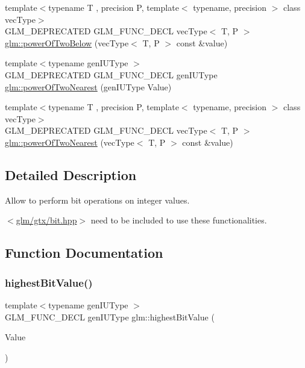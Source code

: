 \begin{DoxyCompactItemize}
\item 
{\footnotesize template$<$typename T , precision P, template$<$ typename, precision $>$ class vec\+Type$>$ }\\G\+L\+M\+\_\+\+D\+E\+P\+R\+E\+C\+A\+T\+ED G\+L\+M\+\_\+\+F\+U\+N\+C\+\_\+\+D\+E\+CL vec\+Type$<$ T, P $>$ \hyperlink{group__gtx__bit_gae33bb1ca2b55846b23a0f0796a679195}{glm\+::power\+Of\+Two\+Below} (vec\+Type$<$ T, P $>$ const \&value)
\item 
{\footnotesize template$<$typename gen\+I\+U\+Type $>$ }\\G\+L\+M\+\_\+\+D\+E\+P\+R\+E\+C\+A\+T\+ED G\+L\+M\+\_\+\+F\+U\+N\+C\+\_\+\+D\+E\+CL gen\+I\+U\+Type \hyperlink{group__gtx__bit_ga5f65973a5d2ea38c719e6a663149ead9}{glm\+::power\+Of\+Two\+Nearest} (gen\+I\+U\+Type Value)
\item 
{\footnotesize template$<$typename T , precision P, template$<$ typename, precision $>$ class vec\+Type$>$ }\\G\+L\+M\+\_\+\+D\+E\+P\+R\+E\+C\+A\+T\+ED G\+L\+M\+\_\+\+F\+U\+N\+C\+\_\+\+D\+E\+CL vec\+Type$<$ T, P $>$ \hyperlink{group__gtx__bit_ga2d7e85995d097518b8d70cd409bda39e}{glm\+::power\+Of\+Two\+Nearest} (vec\+Type$<$ T, P $>$ const \&value)
\end{DoxyCompactItemize}


\subsection{Detailed Description}
Allow to perform bit operations on integer values. 

$<$\hyperlink{bit_8hpp}{glm/gtx/bit.\+hpp}$>$ need to be included to use these functionalities. 

\subsection{Function Documentation}
\mbox{\label{group__gtx__bit_ga0dcc8fe7c3d3ad60dea409281efa3d05}} 
\subsubsection{\texorpdfstring{highest\+Bit\+Value()}{highestBitValue()}\hspace{0.1cm}{\footnotesize\ttfamily [1/2]}}
{\footnotesize\ttfamily template$<$typename gen\+I\+U\+Type $>$ \\
G\+L\+M\+\_\+\+F\+U\+N\+C\+\_\+\+D\+E\+CL gen\+I\+U\+Type glm\+::highest\+Bit\+Value (\begin{DoxyParamCaption}\item[{gen\+I\+U\+Type}]{Value }\end{DoxyParamCaption})}

